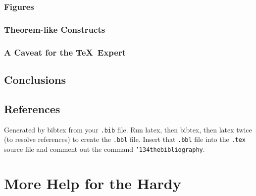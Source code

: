 \documentclass[sigconf]{acmart}
\begin{document}
\subsubsection{Figures}
\subsubsection{Theorem-like Constructs}
\subsubsection*{A Caveat for the \TeX\ Expert}
\subsection{Conclusions}
\subsection{References}

Generated by bibtex from your \texttt{.bib} file.  Run latex, then
bibtex, then latex twice (to resolve references) to create the
\texttt{.bbl} file.  Insert that \texttt{.bbl} file into the
\texttt{.tex} source file and comment out the command
\texttt{{\char'134}thebibliography}.

\section{More Help for the Hardy}


 
\end{document}
